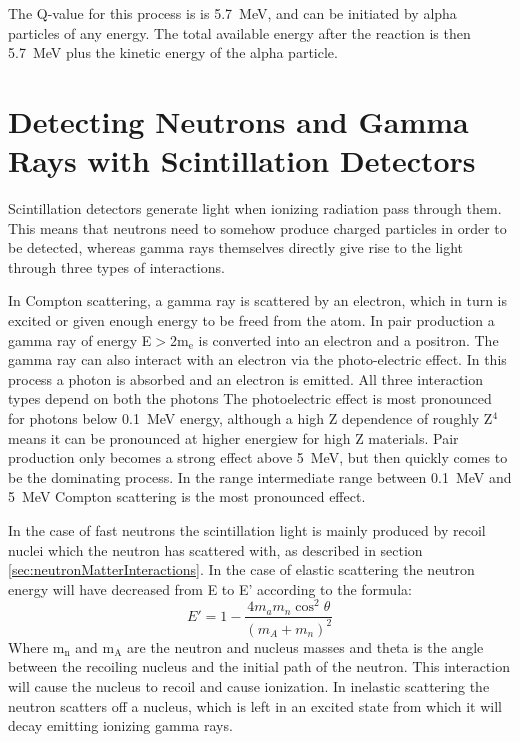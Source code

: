 \documentclass[main.tex]{subfiles}
\begin{document}
The Q-value for this process is is \SI{5.7}{MeV}, and can be initiated by alpha particles of any energy. The total available energy after the reaction is then \SI{5.7}{MeV} plus the kinetic energy of the alpha particle.

\section{Detecting Neutrons and Gamma Rays with Scintillation Detectors}
Scintillation detectors generate light when ionizing radiation pass through them. This means that neutrons need to somehow produce charged particles in order to be detected, whereas gamma rays themselves directly give rise to the light through three types of interactions.

In Compton scattering, a gamma ray is scattered by an electron, which in turn is excited or given enough energy to be freed from the atom. In pair production a gamma ray of energy E$>$2m$_\text{e}$ is converted into an electron and a positron. The gamma ray can also interact with an electron via the photo-electric effect. In this process a photon is absorbed and an electron is emitted. All three interaction types depend on both the photons
The photoelectric effect is most pronounced for photons below \SI{0.1}{\MeV} energy, although a high Z dependence of roughly Z$^\text{4}$ means it can be pronounced at higher energiew for high Z materials. Pair production only becomes a strong effect above \SI{5}{\MeV}, but then quickly comes to be the dominating process. In the range intermediate range between \SI{0.1}{\MeV} and \SI{5}{\MeV} Compton scattering is the most pronounced effect.

In the case of fast neutrons the scintillation light is mainly produced by recoil nuclei which the neutron has scattered with, as described in section \ref{sec:neutronMatterInteractions}. In the case of elastic scattering the neutron energy will have decreased from E to E' according to the formula\cite[pg. 219]{Tavernier}:
\begin{equation}
	E' = 1 - \frac{4m_a m_n \cos^2{\theta}}{\left(m_A + m_n\right)^2}
\end{equation}
Where m$_\text{n}$ and m$_\text{A}$ are the neutron and nucleus masses and theta is the angle between the recoiling nucleus and the initial path of the neutron. This interaction will cause the nucleus to recoil and cause ionization. In inelastic scattering the neutron scatters off a nucleus, which is left in an excited state from which it will decay emitting ionizing gamma rays.
\end{document}

